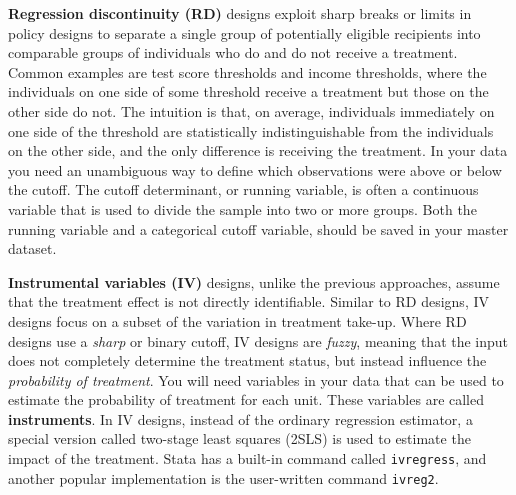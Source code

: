 \textbf{Regression discontinuity (RD)}
designs exploit sharp breaks or limits
in policy designs to separate a single group of potentially eligible recipients
into comparable groups of individuals who do and do not receive a treatment.
Common examples are test score thresholds and income thresholds,
where the individuals on one side of some threshold receive
a treatment but those on the other side do not.
The intuition is that, on average,
individuals immediately on one side of the threshold
are statistically indistinguishable from the individuals on the other side,
and the only difference is receiving the treatment.
In your data you need an unambiguous way
to define which observations were above or below the cutoff.
The cutoff determinant, or running variable,
is often a continuous variable 
that is used to divide the sample into two or more groups. 
Both the running variable and a categorical cutoff variable,
should be saved in your master dataset.


\textbf{Instrumental variables (IV)}
designs, unlike the previous approaches,
assume that the treatment effect is not directly identifiable.
Similar to RD designs,
IV designs focus on a subset of the variation in treatment take-up.
Where RD designs use a \textit{sharp} or binary cutoff,
IV designs are \textit{fuzzy}, meaning that the input does not completely determine
the treatment status, but instead influence the \textit{probability of treatment}.
You will need variables in your data
that can be used to estimate the probability of treatment for each unit.
These variables are called \textbf{instruments}.
In IV designs, instead of the ordinary regression estimator,
a special version called two-stage least squares (2SLS) is used
to estimate the impact of the treatment.
Stata has a built-in command called \texttt{ivregress},
and another popular implementation is the user-written command \texttt{ivreg2}.



